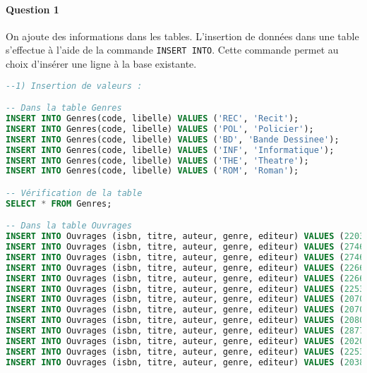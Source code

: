 \documentclass[10pt, oneside]{article}
\begin{document}

\paragraph{Question 1} On ajoute des informations dans les tables. L'insertion de données dans une table s'effectue à l'aide de la commande \texttt{INSERT INTO}. Cette commande permet au choix d'insérer une ligne à la base existante.

\begin{lstlisting}[language=sql, title=Question 1, label=QII1]
--1) Insertion de valeurs :

-- Dans la table Genres
INSERT INTO Genres(code, libelle) VALUES ('REC', 'Recit');
INSERT INTO Genres(code, libelle) VALUES ('POL', 'Policier');
INSERT INTO Genres(code, libelle) VALUES ('BD', 'Bande Dessinee');
INSERT INTO Genres(code, libelle) VALUES ('INF', 'Informatique');
INSERT INTO Genres(code, libelle) VALUES ('THE', 'Theatre');
INSERT INTO Genres(code, libelle) VALUES ('ROM', 'Roman');

-- Vérification de la table
SELECT * FROM Genres;

-- Dans la table Ouvrages
INSERT INTO Ouvrages (isbn, titre, auteur, genre, editeur) VALUES (2203314168, 'LEFRANC-L''ultimatum', 'Martin, Carin', 'BD', 'Casterman');
INSERT INTO Ouvrages (isbn, titre, auteur, genre, editeur) VALUES (2746021285, 'HTML entrainez-vous pour maitriser le code source', 'Luc Van Lancker', 'INF', 'ENI');
INSERT INTO Ouvrages (isbn, titre, auteur, genre, editeur) VALUES (2746026090, 'Oracle 10g SQL, PL/SQL, SQL*Plus', 'J.Gabillaud', 'INF', 'ENI');
INSERT INTO Ouvrages (isbn, titre, auteur, genre, editeur) VALUES (2266085816, 'Pantagruel', 'F. Robert', 'ROM', 'Pocket');
INSERT INTO Ouvrages (isbn, titre, auteur, genre, editeur) VALUES (2266091611, 'Voyage au centre de la terre', 'Jules VERNE', 'ROM', 'Pocket');
INSERT INTO Ouvrages (isbn, titre, auteur, genre, editeur) VALUES (2253010219, 'Le crime de l''Orient Express', 'Agatha Christie', 'POL', 'Livre de Poche');
INSERT INTO Ouvrages (isbn, titre, auteur, genre, editeur) VALUES (2070400816, 'Le Bourgeois gentilhomme', 'Moliere', 'THE', 'Gallimard');
INSERT INTO Ouvrages (isbn, titre, auteur, genre, editeur) VALUES (2070367177, 'Le cure de Tours', 'Honore de Balzac', 'ROM', 'Gallimard');
INSERT INTO Ouvrages (isbn, titre, auteur, genre, editeur) VALUES (2080720872, 'Boule de suif', 'G. de Maupassant', 'REC', 'Flammarion');
INSERT INTO Ouvrages (isbn, titre, auteur, genre, editeur) VALUES (2877065073, 'La gloire de mon pere', 'Marcel Pagnol', 'ROM', 'Fallois');
INSERT INTO Ouvrages (isbn, titre, auteur, genre, editeur) VALUES (2020549522, 'L''aventure des manuscrits de la mer morte', DEFAULT, 'REC', 'Seuil');
INSERT INTO Ouvrages (isbn, titre, auteur, genre, editeur) VALUES (2253006327, 'Vingt mille lieues sous les mers', 'Jules Verne', 'ROM', 'LGF');
INSERT INTO Ouvrages (isbn, titre, auteur, genre, editeur) VALUES (2038704015, 'De la terre a la lune', 'Jules Verne', 'ROM', 'Larousse');


\end{lstlisting}
\end{document}
